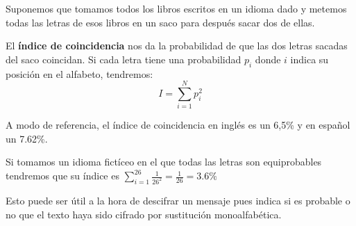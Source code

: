 \begin{defn}
Suponemos que tomamos todos los libros escritos en un idioma dado y metemos todas las letras de esos libros en un saco para después sacar dos de ellas.

El \textbf{índice de coincidencia} nos da la probabilidad de que las dos letras sacadas del saco coincidan. Si cada letra tiene una probabilidad $p_i$ donde $i$ indica su posición en el alfabeto, tendremos:
\[I = \sum_{i=1}^N p_i^2\]

A modo de referencia, el índice de coincidencia en inglés es un 6,5\% y en español un 7.62\%.

Si tomamos un idioma fictíceo en el que todas las letras son equiprobables tendremos que su índice es $\sum_{i=1}^{26}\frac{1}{26^2} = \frac{1}{26} = 3.6\%$
\end{defn}

Esto puede ser útil a la hora de descifrar un mensaje pues indica si es probable o no que el texto haya sido cifrado por sustitución monoalfabética.

